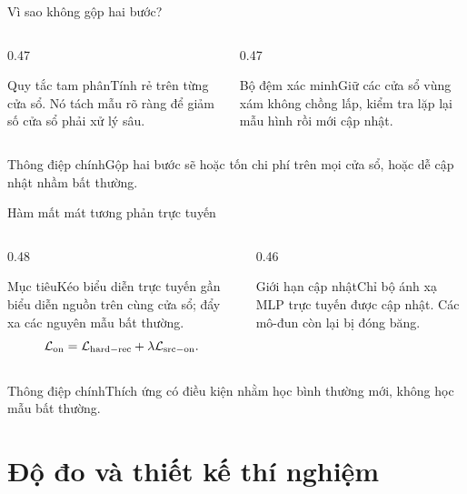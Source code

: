 \documentclass[aspectratio=169]{beamer}
\newcommand{\takeaway}[1]{\begin{alertblock}{Thông điệp chính}#1\end{alertblock}}
\begin{document}
\begin{frame}{Vì sao không gộp hai bước?}
  \begin{columns}[T,onlytextwidth]
    \begin{column}{0.47\textwidth}\begin{block}{Quy tắc tam phân}Tính rẻ trên từng cửa sổ. Nó tách mẫu rõ ràng để giảm số cửa sổ phải xử lý sâu.\end{block}\end{column}
    \begin{column}{0.47\textwidth}\begin{alertblock}{Bộ đệm xác minh}Giữ các cửa sổ vùng xám không chồng lấp, kiểm tra lặp lại mẫu hình rồi mới cập nhật.\end{alertblock}\end{column}
  \end{columns}
  \takeaway{Gộp hai bước sẽ hoặc tốn chi phí trên mọi cửa sổ, hoặc dễ cập nhật nhầm bất thường.}
\end{frame}

\begin{frame}{Hàm mất mát tương phản trực tuyến}
  \begin{columns}[T,onlytextwidth]
    \begin{column}{0.48\textwidth}\begin{block}{Mục tiêu}Kéo biểu diễn trực tuyến gần biểu diễn nguồn trên cùng cửa sổ; đẩy xa các nguyên mẫu bất thường.\[\mathcal L_{\rm on}=\mathcal L_{\rm hard-rec}+\lambda\mathcal L_{\rm src-on}.\]\end{block}\end{column}
    \begin{column}{0.46\textwidth}\begin{alertblock}{Giới hạn cập nhật}Chỉ bộ ánh xạ MLP trực tuyến được cập nhật. Các mô-đun còn lại bị đóng băng.\end{alertblock}\end{column}
  \end{columns}
  \takeaway{Thích ứng có điều kiện nhằm học bình thường mới, không học mẫu bất thường.}
\end{frame}

\section{Độ đo và thiết kế thí nghiệm}
\end{document}
